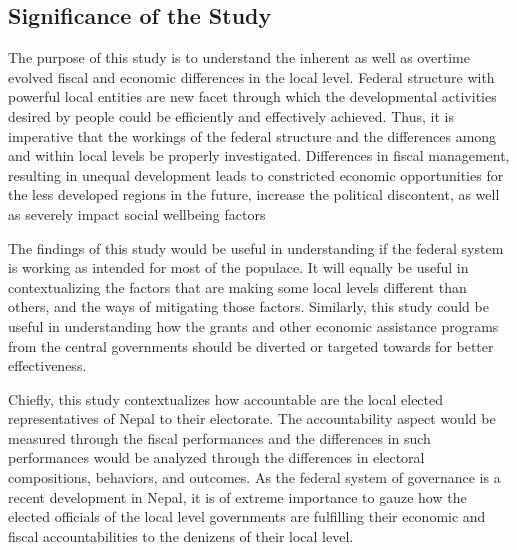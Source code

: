 \subsection{Significance of the Study}
The purpose of this study is to understand the inherent as well as overtime evolved fiscal and economic differences in the local level. Federal structure with powerful local entities are new facet through which the developmental activities desired by people could be efficiently and effectively achieved. Thus, it is imperative that the workings of the federal structure and the differences among and within local levels be properly investigated. Differences in fiscal management, resulting in unequal development leads to constricted economic opportunities for the less developed regions in the future, increase the political discontent, as well as severely impact social wellbeing factors\cite{Saey1998} \par
The findings of this study would be useful in understanding if the federal system is working as intended for most of the populace. It will equally be useful in contextualizing the factors that are making some local levels different than others, and the ways of mitigating those factors. Similarly, this study could be useful in understanding how the grants and other economic assistance programs from the central governments should be diverted or targeted towards for better effectiveness.\par
Chiefly, this study contextualizes how accountable are the local elected representatives of Nepal to their electorate. The accountability aspect would be measured through the fiscal performances and the differences in such performances would be analyzed through the differences in electoral compositions, behaviors, and outcomes. As the federal system of governance is a recent development in Nepal, it is of extreme importance to gauze how the elected officials of the local level governments are fulfilling their economic and fiscal accountabilities to the denizens of their local level. 
